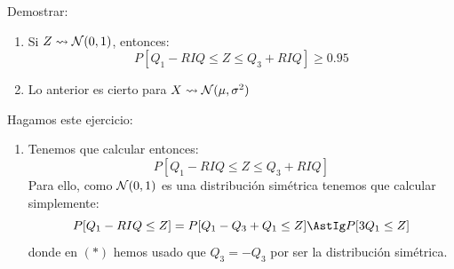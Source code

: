 \begin{ejercicio}
    Demostrar:
    \begin{enumerate}
        \item Si $Z\rightsquigarrow\mathcal{N}(0,1)$, entonces:
            \begin{equation*}
                P[Q_1-RIQ\leq Z \leq Q_3 + RIQ] \geq 0.95
            \end{equation*}
        \item Lo anterior es cierto para $X\rightsquigarrow\mathcal{N}(\mu, \sigma^2)$
    \end{enumerate}
    Hagamos este ejercicio:
    \begin{enumerate}
        \item Tenemos que calcular entonces:
            \begin{equation*}
                P[Q_1-RIQ\leq Z\leq Q_3+RIQ]
            \end{equation*}
            Para ello, como $\mathcal{N}(0,1)$ es una distribución simétrica tenemos que calcular simplemente:
            \begin{equation*}
                P[Q_1-RIQ\leq Z] = P[Q_1-Q_3+Q_1\leq Z] \AstIg P[3Q_1\leq Z]
            \end{equation*}
            donde en $(\ast)$ hemos usado que $Q_3 = -Q_3$ por ser la distribución simétrica.\\


\end{enumerate}
\end{ejercicio}
